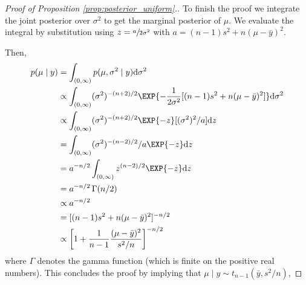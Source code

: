 \begin{proof}[Proof of Proposition \ref{prop:posterior_uniform}.]
  To finish the proof we integrate the joint posterior over $\sigma^2$ to get the marginal posterior of $\mu$.
  We evaluate the integral by substitution using
  $z = \sfrac{a}{2 \sigma^2}$ with $a = (n-1)s^2 + n(\mu - \bar{y})^2$.

  Then,
  \begin{align*}
    p(\mu \mid y) &= \int_{(0, \infty)} p(\mu, \sigma^2 \mid y) \mathrm{d}\sigma^2\\
    &\propto  \int_{(0, \infty)} (\sigma^2)^{-(n+2)/2} \EXP{-\frac{1}{2\sigma^2}[(n-1) s^2 + n(\mu - \bar{y})^2]} \mathrm{d} \sigma^2\\
    &\propto \int_{(0, \infty)} (\sigma^2)^{-(n+2)/2}\EXP{-z} [(\sigma^2)^2 / a] \mathrm{d}z\\
    &= \int_{(0, \infty)} (\sigma^2)^{-(n-2)/2} / a \EXP{-z} \mathrm{d}z\\
    &= a^{-n/2}\int_{(0, \infty)} z^{(n-2)/2}\EXP{-z} \mathrm{d}z\\
    &= a^{-n/2} \, \Gamma(n/2)\\
    &\propto a^{-n/2}\\
    &= [(n-1)s^2 + n(\mu - \bar{y})^2]^{-n/2}\\
    &\propto \left[1 + \frac{1}{n-1} \frac{(\mu - \bar{y})^2}{s^2 / n}\right]^{-n/2} \,
  \end{align*}
  where $\Gamma$ denotes the gamma function (which is finite on the positive real numbers).
  This concludes the proof by implying that $\mu \mid y \sim t_{n-1}(\bar{y}, s^2/n)$,
\end{proof}


